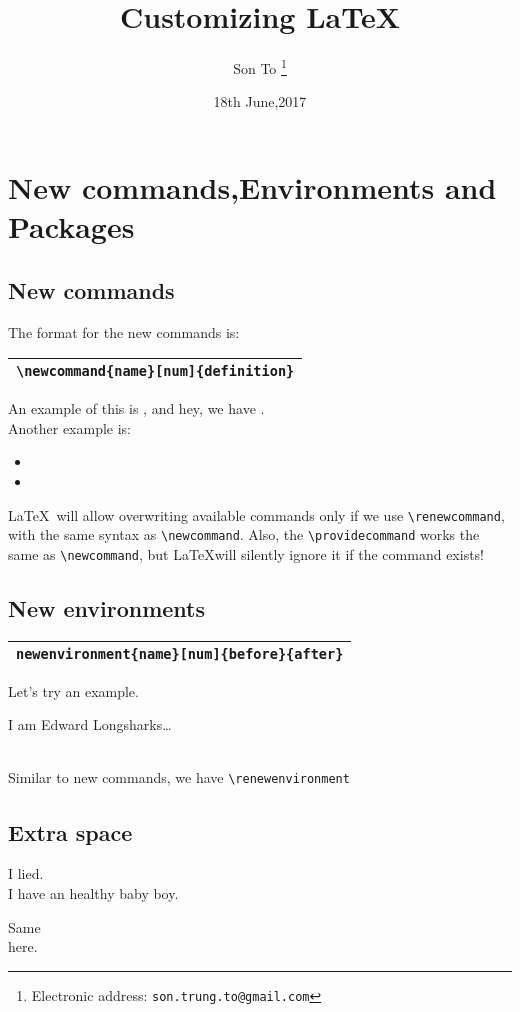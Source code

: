 \documentclass[a4paper,11pt]{article}
\begin{document}
\title{Customizing \LaTeX}
\author{Son To
  \thanks{Electronic address: \texttt{son.trung.to@gmail.com}}}
\date{18th June,2017}

  \maketitle
  \tableofcontents
  \clearpage

\section{New commands,Environments and Packages}
\subsection{New commands}
The format for the new commands is:
\vskip 20pt
\begin{tabular}{|l|}
\hline
  \verb+\newcommand{name}[num]{definition}+ \\
\hline
\end{tabular}
\vskip 20pt
\flushleft
An example of this is \tnss, and hey, we have \tnss.\\
Another example is:
\begin{itemize}
  \item {}
  \item {}
\end{itemize}
\LaTeX~will allow overwriting available commands only if
we use \verb+\renewcommand+, with the same syntax as
\verb+\newcommand+. Also, the \verb+\providecommand+ works
the same as \verb+\newcommand+, but \LaTeX will silently
ignore it if the command exists!

\subsection{New environments}
\vskip 20pt
\begin{tabular}{|l|}
  \hline
    \verb+newenvironment{name}[num]{before}{after}+ \\
  \hline
\end{tabular}
\vskip 20pt
\flushleft
Let's try an example.\\
\begin{king}
  I am Edward Longsharks\ldots
\end{king}
\\
Similar to new commands, we have \verb+\renewenvironment+

\subsection{Extra space}
\begin{simple}
  I lied.\\ I have an healthy baby boy.
\end{simple}
Same\\here.
\end{document}
